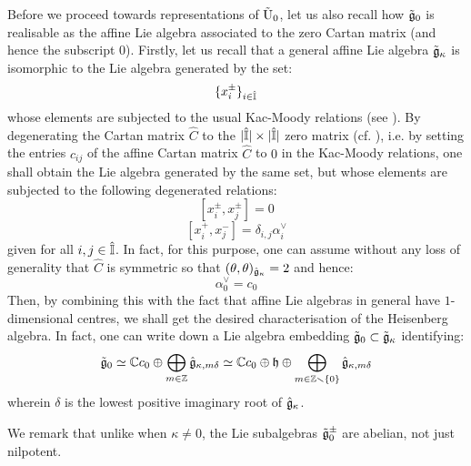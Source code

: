            Before we proceed towards representations of $\tilde{\mathrm{U}}_0$, let us also recall how $\tilde{\mathfrak{g}}_0$ is realisable as the affine Lie algebra associated to the zero Cartan matrix (and hence the subscript $0$). Firstly, let us recall that a general affine Lie algebra $\tilde{\mathfrak{g}}_{\kappa}$ is isomorphic to the Lie algebra generated by the set:
                $$\{x_i^{\pm}\}_{i \in \hat{\mathbb{I}}}$$
            whose elements are subjected to the usual Kac-Moody relations (see \cite[Chapter 1]{kac_infinite_dimensional_lie_algebras}). By degenerating the Cartan matrix $\hat{C}$ to the $|\hat{\simpleroots}| \x |\hat{\simpleroots}|$ zero matrix (cf. \cite[Section 2.9]{kac_infinite_dimensional_lie_algebras}), i.e. by setting the entries $c_{ij}$ of the affine Cartan matrix $\hat{C}$ to $0$ in the Kac-Moody relations, one shall obtain the Lie algebra generated by the same set, but whose elements are subjected to the following degenerated relations:
                $$[x_i^{\pm}, x_j^{\pm}] = 0$$
                $$[x_i^+, x_j^-] = \delta_{i, j} \alpha_i^{\vee}$$
            given for all $i, j \in \hat{\mathbb{I}}$. In fact, for this purpose, one can assume without any loss of generality that $\hat{C}$ is symmetric so that $(\theta, \theta)_{\hat{\mathfrak{g}}_{\kappa}} = 2$ and hence:
                $$\alpha_0^{\vee} = c_0$$
            Then, by combining this with the fact that affine Lie algebras in general have $1$-dimensional centres, we shall get the desired characterisation of the Heisenberg algebra. In fact, one can write down a Lie algebra embedding $\tilde{\mathfrak{g}}_0 \subset \tilde{\mathfrak{g}}_{\kappa}$ identifying:
                $$\tilde{\mathfrak{g}}_0 \simeq \mathbb{C} c_0 \oplus \bigoplus_{m \in \mathbb{Z}} \hat{\mathfrak{g}}_{\kappa, m\delta} \simeq \mathbb{C} c_0 \oplus \mathfrak{h} \oplus \bigoplus_{m \in \mathbb{Z} \smallsetminus \{0\}} \hat{\mathfrak{g}}_{\kappa, m\delta}$$
            wherein $\delta$ is the lowest positive imaginary root of $\hat{\mathfrak{g}}_{\kappa}$.
            
            We remark that unlike when $\kappa \not = 0$, the Lie subalgebras $\tilde{\mathfrak{g}}_0^{\pm}$ are abelian, not just nilpotent.

